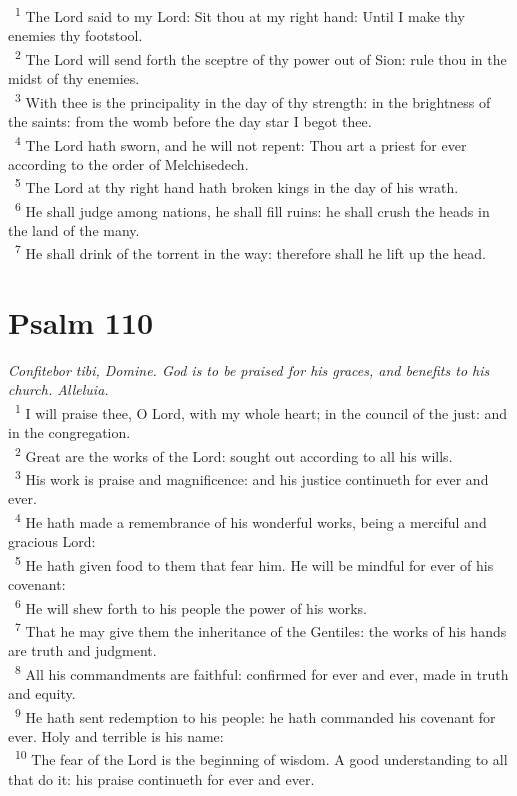 \documentclass[a5paper,12pt]{article}
\begin{document}
\begin{multicols*}{2}
~\textsuperscript{1} The Lord said to my Lord: Sit thou at my right hand: Until I make thy enemies thy footstool.\\
~\textsuperscript{2} The Lord will send forth the sceptre of thy power out of Sion: rule thou in the midst of thy enemies.\\
~\textsuperscript{3} With thee is the principality in the day of thy strength: in the brightness of the saints: from the womb before the day star I begot thee.\\
~\textsuperscript{4} The Lord hath sworn, and he will not repent: Thou art a priest for ever according to the order of Melchisedech.\\
~\textsuperscript{5} The Lord at thy right hand hath broken kings in the day of his wrath.\\
~\textsuperscript{6} He shall judge among nations, he shall fill ruins: he shall crush the heads in the land of the many.\\
~\textsuperscript{7} He shall drink of the torrent in the way: therefore shall he lift up the head.\\

\section{Psalm 110}
\label{sec:org8db3983}
\emph{Confitebor tibi, Domine. God is to be praised for his graces, and benefits to his church. Alleluia.}\\

~\textsuperscript{1} I will praise thee, O Lord, with my whole heart; in the council of the just: and in the congregation.\\
~\textsuperscript{2} Great are the works of the Lord: sought out according to all his wills.\\
~\textsuperscript{3} His work is praise and magnificence: and his justice continueth for ever and ever.\\
~\textsuperscript{4} He hath made a remembrance of his wonderful works, being a merciful and gracious Lord:\\
~\textsuperscript{5} He hath given food to them that fear him. He will be mindful for ever of his covenant:\\
~\textsuperscript{6} He will shew forth to his people the power of his works.\\
~\textsuperscript{7} That he may give them the inheritance of the Gentiles: the works of his hands are truth and judgment.\\
~\textsuperscript{8} All his commandments are faithful: confirmed for ever and ever, made in truth and equity.\\
~\textsuperscript{9} He hath sent redemption to his people: he hath commanded his covenant for ever. Holy and terrible is his name:\\
~\textsuperscript{10} The fear of the Lord is the beginning of wisdom. A good understanding to all that do it: his praise continueth for ever and ever.\\


\end{multicols*}
\end{document}
